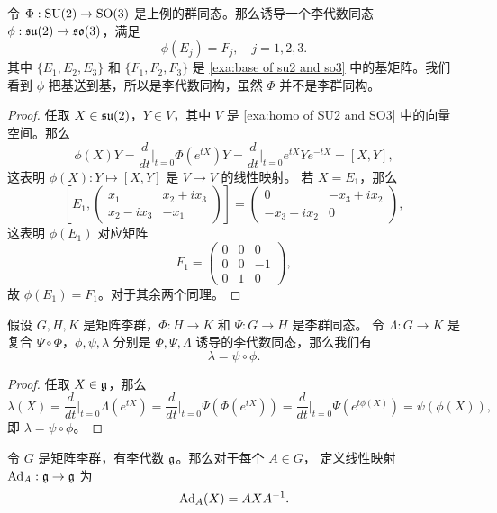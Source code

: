 \begin{example}
  令 $\Phi:\operatorname{SU}(2)\to\operatorname{SO}(3)$ 是上例的群同态。那么诱导一个李代数同态
  $\phi:\mathfrak{su}(2)\to\mathfrak{so}(3)$，满足
  \[
    \phi(E_j)=F_j,\quad j=1,2,3.
  \]
  其中 $\{E_1,E_2,E_3\}$ 和 $\{F_1,F_2,F_3\}$ 是 \autoref{exa:base of su2 and so3}
  中的基矩阵。我们看到 $\phi$ 把基送到基，所以是李代数同构，虽然 $\Phi$
  并不是李群同构。
\end{example}
\begin{proof}
  任取 $X\in\mathfrak{su}(2)$，$Y\in V$，其中 $V$ 是 \autoref{exa:homo of SU2 and SO3}
  中的向量空间。那么
  \[
    \phi(X)Y=\frac{d}{dt}\bigg|_{t=0}\Phi(e^{tX})Y
    =\frac{d}{dt}\bigg|_{t=0} e^{tX}Ye^{-tX}=[X,Y],
  \]
  这表明 $\phi(X):Y\mapsto [X,Y]$ 是 $V\to V$ 的线性映射。
  若 $X=E_1$，那么
  \[
    \left[E_1,
    \begin{pmatrix}
      x_1 & x_2+ix_3\\
      x_2-ix_3 & -x_1 
    \end{pmatrix}
    \right]=\begin{pmatrix}
      0 & -x_3+ix_2\\
      -x_3-ix_2 & 0
    \end{pmatrix},
  \]
  这表明 $\phi(E_1)$ 对应矩阵
  \[
    F_1=\begin{pmatrix}
      0 & 0 & 0 \\
      0 & 0 & -1 \\
      0 & 1 & 0
    \end{pmatrix},
  \] 
  故 $\phi(E_1)=F_1$。对于其余两个同理。
\end{proof}

\begin{proposition}
  假设 $G,H,K$ 是矩阵李群，$\Phi:H\to K$ 和 $\Psi:G\to H$ 是李群同态。
  令 $\Lambda:G\to K$ 是复合 $\Psi\circ\Phi$，$\phi,\psi,\lambda$
  分别是 $\Phi,\Psi,\Lambda$ 诱导的李代数同态，那么我们有
  \[
    \lambda=\psi\circ \phi.
  \]
\end{proposition}
\begin{proof}
  任取 $X\in\mathfrak{g}$，那么
  \[
    \lambda(X)=\frac{d}{dt}\bigg|_{t=0}\Lambda(e^{tX})
    =\frac{d}{dt}\bigg|_{t=0}\Psi(\Phi(e^{tX}))
    =\frac{d}{dt}\bigg|_{t=0}\Psi(e^{t\phi(X)})
    =\psi(\phi(X)),
  \]
  即 $\lambda=\psi\circ\phi$。
\end{proof}

\begin{definition}
  令 $G$ 是矩阵李群，有李代数 $\mathfrak{g}$。那么对于每个 $A\in G$，
  定义线性映射 $\operatorname{Ad}_A:\mathfrak{g}\to\mathfrak{g}$ 为
  \[
    \operatorname{Ad}_A(X)=AXA^{-1}.
  \]
\end{definition}

